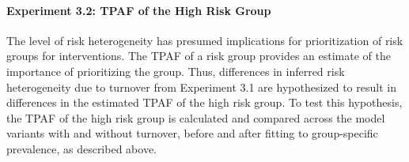 \paragraph{Experiment 3.2: TPAF of the High Risk Group}
The level of risk heterogeneity has presumed implications
for prioritization of risk groups for interventions.
The TPAF of a risk group provides an estimate of
the importance of prioritizing the group.
Thus, differences in inferred risk heterogeneity due to turnover from Experiment 3.1
are hypothesized to result in differences in the estimated TPAF of the high risk group.
To test this hypothesis, the TPAF of the high risk group
is calculated and compared across the model variants with and without turnover,
before and after fitting to group-specific prevalence, as described above.